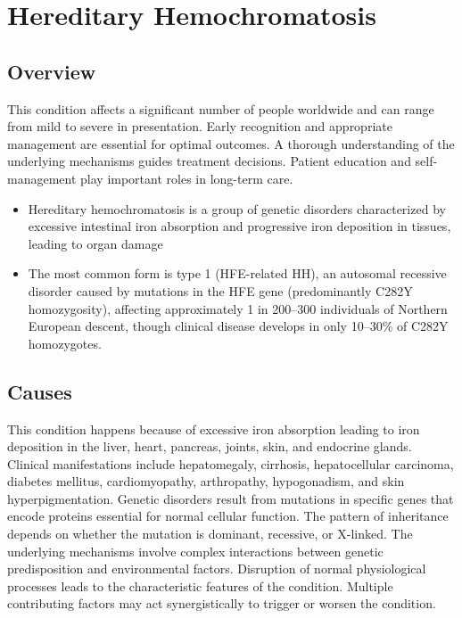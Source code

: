 \chapter{Hereditary Hemochromatosis}
\label{sec:Hereditary Hemochromatosis}

\section{Overview}
This condition affects a significant number of people worldwide and can range from mild to severe in presentation. Early recognition and appropriate management are essential for optimal outcomes. A thorough understanding of the underlying mechanisms guides treatment decisions. Patient education and self-management play important roles in long-term care.

\begin{itemize}[noitemsep]
  \item Hereditary hemochromatosis is a group of genetic disorders characterized by excessive intestinal iron absorption and progressive iron deposition in tissues, leading to organ damage
  \item The most common form is type 1 (HFE-related HH), an autosomal recessive disorder caused by mutations in the HFE gene (predominantly C282Y homozygosity), affecting approximately 1 in 200--300 individuals of Northern European descent, though clinical disease develops in only 10--30\% of C282Y homozygotes.
\end{itemize}
\section{Causes}
This condition happens because of excessive iron absorption leading to iron deposition in the liver, heart, pancreas, joints, skin, and endocrine glands. Clinical manifestations include hepatomegaly, cirrhosis, hepatocellular carcinoma, diabetes mellitus, cardiomyopathy, arthropathy, hypogonadism, and skin hyperpigmentation. Genetic disorders result from mutations in specific genes that encode proteins essential for normal cellular function. The pattern of inheritance depends on whether the mutation is dominant, recessive, or X-linked. The underlying mechanisms involve complex interactions between genetic predisposition and environmental factors. Disruption of normal physiological processes leads to the characteristic features of the condition. Multiple contributing factors may act synergistically to trigger or worsen the condition.
